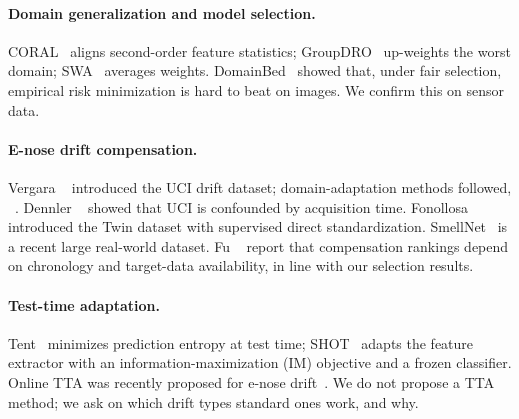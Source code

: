 \documentclass[10pt,twocolumn,letterpaper]{article}
\begin{document}
\paragraph{Domain generalization and model selection.} CORAL~\cite{sun2016coral} aligns second-order feature
statistics; GroupDRO~\cite{sagawa2020groupdro} up-weights the worst domain; SWA~\cite{izmailov2018swa} averages
weights. DomainBed~\cite{gulrajani2021domainbed} showed that, under fair selection, empirical risk minimization is
hard to beat on images. We confirm this on sensor data.

\paragraph{E-nose drift compensation.} Vergara \etal~\cite{vergara2012drift} introduced the UCI drift dataset;
domain-adaptation methods followed, \eg~\cite{zhang2015daelm}. Dennler \etal~\cite{dennler2022drift} showed that
UCI is confounded by acquisition time. Fonollosa \etal~\cite{fonollosa2016twin} introduced the Twin dataset with
supervised direct standardization. SmellNet~\cite{feng2025smellnet} is a recent large real-world dataset. Fu
\etal~\cite{fu2026protocol} report that compensation rankings depend on chronology and target-data availability, in
line with our selection results.

\paragraph{Test-time adaptation.} Tent~\cite{wang2021tent} minimizes prediction entropy at test time;
SHOT~\cite{liang2020shot} adapts the feature extractor with an information-maximization (IM) objective and a frozen
classifier. Online TTA was recently proposed for e-nose drift~\cite{liang2024otta,liang2025otta}. We do not propose
a TTA method; we ask on which drift types standard ones work, and why.

\end{document}
